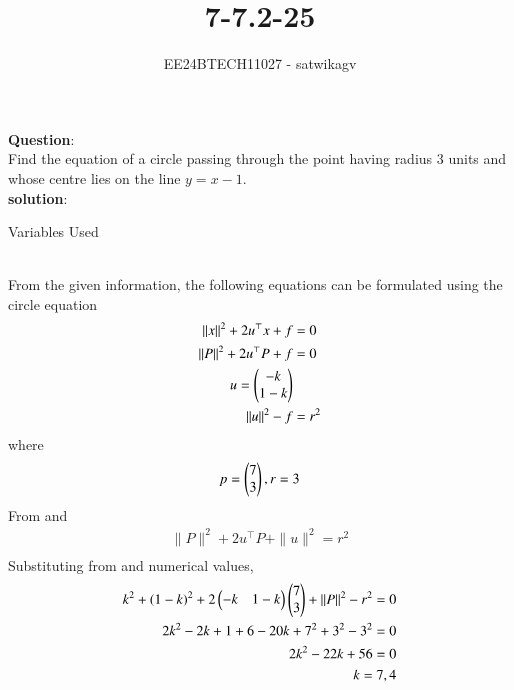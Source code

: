 \documentclass[journal]{IEEEtran}
\begin{document}

\vspace{3cm}

\title{7-7.2-25}
\author{EE24BTECH11027 - satwikagv}
{\let\newpage\relax\maketitle}

\renewcommand{\thefigure}{\theenumi}
\renewcommand{\thetable}{\theenumi}
\setlength{\intextsep}{10pt} %


\renewcommand{\thetable}{\theenumi}
\textbf{Question}:\\
Find the equation of a circle passing through the point  having radius 3 units and whose centre lies on the line $y=x-1$.\\
\textbf{solution}:
\begin{table}[h!]    
  \centering
  
  \caption{Variables Used}
\end{table}
\\From the given information, the following equations can be formulated using the circle equation 
\begin{align}
\|x\|^2 + 2u^\top x + f &= 0\\
\|P\|^2 + 2u^\top P + f &= 0\\
u=\begin{pmatrix}-k\\1-k\end{pmatrix}\\
\|u\|^2 - f &= r^2\\
\end{align}
where\\
\begin{align}
p=\begin{pmatrix}7\\3\end{pmatrix},r=3\\
\end{align}
From  and 
\begin{align}
\|P\|^2 + 2u^\top P + \|u\|^2 = r^2\\ 	
\end{align}
Substituting from  and numerical values,
\begin{align}
k^2+(1-k)^2+2\begin{pmatrix}-k&1-k\end{pmatrix}\begin{pmatrix}7\\3\end{pmatrix}+\|P\|^2-r^2 = 0\\
2k^2-2k+1+6-20k+7^2+3^2-3^2=0\\
2k^2-22k+56=0\\
k=7,4\\
\end{align}
\end{document}
